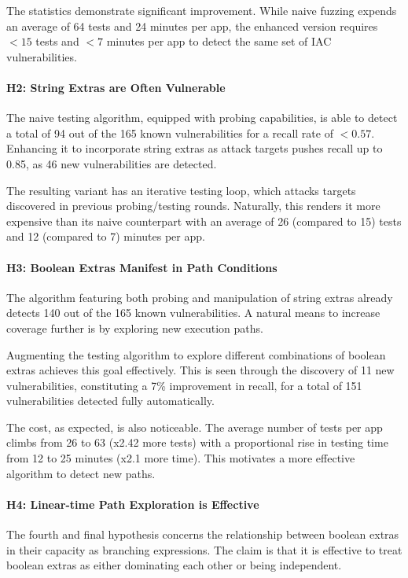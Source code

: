 The statistics demonstrate significant improvement. While naive fuzzing expends an average of 64 tests and 24 minutes per app, the enhanced version requires $<15$ tests and $<7$ minutes per app to detect the same set of IAC vulnerabilities.

\paragraph{H2: String Extras are Often Vulnerable} The naive testing algorithm, equipped with probing capabilities, is able to detect a total of 94 out of the 165 known vulnerabilities for a recall rate of $<0.57$. Enhancing it to incorporate string extras as attack targets pushes recall up to 0.85, as 46 new vulnerabilities are detected.

The resulting variant has an iterative testing loop, which attacks targets discovered in previous probing/testing rounds. Naturally, this renders it more expensive than its naive counterpart with an average of 26 (compared to 15) tests and 12 (compared to 7) minutes per app.

\paragraph{H3: Boolean Extras Manifest in Path Conditions} The algorithm featuring both probing and manipulation of string extras already detects 140 out of the 165 known vulnerabilities. A natural means to increase coverage further is by exploring new execution paths.

Augmenting the testing algorithm to explore different combinations of boolean extras achieves this goal effectively. This is seen through the discovery of 11 new vulnerabilities, constituting a 7\% improvement in recall, for a total of 151 vulnerabilities detected fully automatically. 

The cost, as expected, is also noticeable. The average number of tests per app climbs from 26 to 63 (x2.42 more tests) with a proportional rise in testing time from 12 to 25 minutes (x2.1 more time). This motivates a more effective algorithm to detect new paths.

\paragraph{H4: Linear-time Path Exploration is Effective} The fourth and final hypothesis concerns the relationship between boolean extras in their capacity as branching expressions. The claim is that it is effective to treat boolean extras as either dominating each other or being independent.

